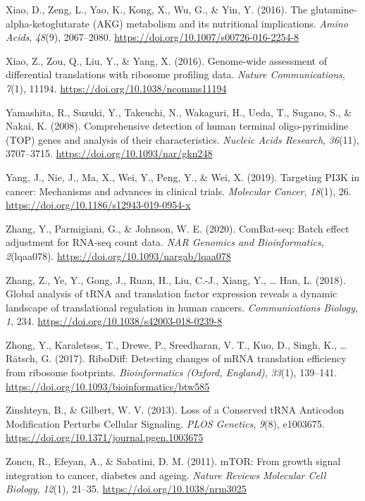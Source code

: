 \documentclass[12pt,openany]{book}
\begin{document}
\hypertarget{ref-Xiao2016a}{}
Xiao, D., Zeng, L., Yao, K., Kong, X., Wu, G., \& Yin, Y. (2016). The
glutamine-alpha-ketoglutarate (AKG) metabolism and its nutritional
implications. \emph{Amino Acids}, \emph{48}(9), 2067--2080.
\url{https://doi.org/10.1007/s00726-016-2254-8}

\hypertarget{ref-Xiao2016}{}
Xiao, Z., Zou, Q., Liu, Y., \& Yang, X. (2016). Genome-wide assessment
of differential translations with ribosome profiling data. \emph{Nature
Communications}, \emph{7}(1), 11194.
\url{https://doi.org/10.1038/ncomms11194}

\hypertarget{ref-Yamashita2008}{}
Yamashita, R., Suzuki, Y., Takeuchi, N., Wakaguri, H., Ueda, T., Sugano,
S., \& Nakai, K. (2008). Comprehensive detection of human terminal
oligo-pyrimidine (TOP) genes and analysis of their characteristics.
\emph{Nucleic Acids Research}, \emph{36}(11), 3707--3715.
\url{https://doi.org/10.1093/nar/gkn248}

\hypertarget{ref-Yang2019}{}
Yang, J., Nie, J., Ma, X., Wei, Y., Peng, Y., \& Wei, X. (2019).
Targeting PI3K in cancer: Mechanisms and advances in clinical trials.
\emph{Molecular Cancer}, \emph{18}(1), 26.
\url{https://doi.org/10.1186/s12943-019-0954-x}

\hypertarget{ref-Zhang2020}{}
Zhang, Y., Parmigiani, G., \& Johnson, W. E. (2020). ComBat-seq: Batch
effect adjustment for RNA-seq count data. \emph{NAR Genomics and
Bioinformatics}, \emph{2}(lqaa078).
\url{https://doi.org/10.1093/nargab/lqaa078}

\hypertarget{ref-Zhang2018}{}
Zhang, Z., Ye, Y., Gong, J., Ruan, H., Liu, C.-J., Xiang, Y., \ldots{}
Han, L. (2018). Global analysis of tRNA and translation factor
expression reveals a dynamic landscape of translational regulation in
human cancers. \emph{Communications Biology}, \emph{1}, 234.
\url{https://doi.org/10.1038/s42003-018-0239-8}

\hypertarget{ref-Zhong2017}{}
Zhong, Y., Karaletsos, T., Drewe, P., Sreedharan, V. T., Kuo, D., Singh,
K., \ldots{} Rätsch, G. (2017). RiboDiff: Detecting changes of mRNA
translation efficiency from ribosome footprints. \emph{Bioinformatics
(Oxford, England)}, \emph{33}(1), 139--141.
\url{https://doi.org/10.1093/bioinformatics/btw585}

\hypertarget{ref-Zinshteyn2013}{}
Zinshteyn, B., \& Gilbert, W. V. (2013). Loss of a Conserved tRNA
Anticodon Modification Perturbs Cellular Signaling. \emph{PLOS
Genetics}, \emph{9}(8), e1003675.
\url{https://doi.org/10.1371/journal.pgen.1003675}

\hypertarget{ref-Zoncu2011}{}
Zoncu, R., Efeyan, A., \& Sabatini, D. M. (2011). mTOR: From growth
signal integration to cancer, diabetes and ageing. \emph{Nature Reviews
Molecular Cell Biology}, \emph{12}(1), 21--35.
\url{https://doi.org/10.1038/nrm3025}
\end{document}
